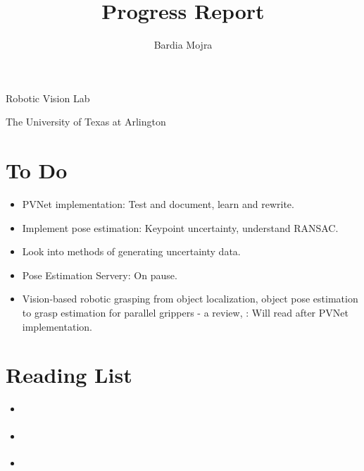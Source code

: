 \documentclass[11pt]{article}
\title{Progress Report}
\author{Bardia Mojra}
\begin{document}
\maketitle
\thispagestyle{empty}

\bigskip
\bigskip
\begin{center}
      Robotic Vision Lab
\end{center}

\begin{center}
      The University of Texas at Arlington
\end{center}

\newpage

\section{To Do}
\begin{itemize}
      \item PVNet implementation: Test and document, learn and rewrite.
      \item Implement pose estimation: Keypoint uncertainty, understand RANSAC.
      \item Look into methods of generating uncertainty data.
      \item Pose Estimation Servery: On pause.
      \item Vision-based robotic grasping from object localization, object pose
      estimation to grasp estimation for parallel grippers - a review,
      \cite{du2020vision}: Will read after PVNet implementation.
\end{itemize}

\section{Reading List}
\begin{itemize}
      \item \cite{ferraz2014leveraging}
      \item \cite{he2015deep}
      \item \cite{du2020vision}
\end{itemize}
\end{document}
